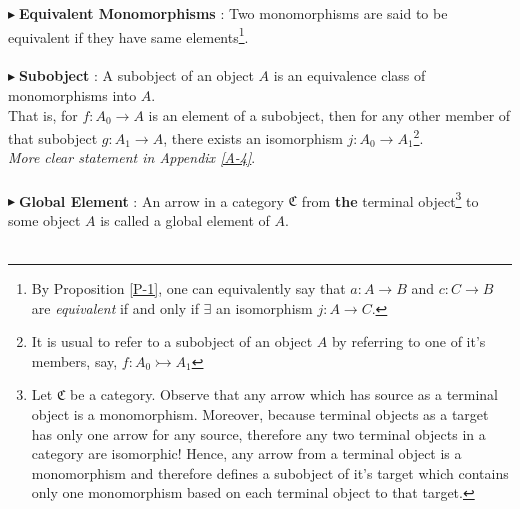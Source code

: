 \documentclass{article}
\theoremstyle{definition}
\theoremstyle{remark}
\theoremstyle{definition}
\theoremstyle{definition}
\theoremstyle{definition}
\newcommand{\cat}[1]{\mathfrak{#1}}
\newcommand{\point}[0]{$\blacktriangleright\;$}
\begin{document}
\point \textbf{Equivalent Monomorphisms} : Two monomorphisms are said to be equivalent if they have same elements\footnote{By Proposition \ref{P-1}, one can equivalently say that $ a : A\to B $ and $ c : C\to B $ are \emph{equivalent} if and only if $ \exists $ an isomorphism $ j : A \to C $.}.\\\\
\point \textbf{Subobject} : A subobject of an object $ A $ is an equivalence class of monomorphisms into $ A $.\\
 That is, for $ f : A_0 \to A $ is an element of a subobject, then for any other member of that subobject $ g : A_1\to A $, there exists an isomorphism $ j : A_0 \to A_1 $\footnote{It is usual to refer to a subobject of an object $ A $ by referring to one of it's members, say, $ f : A_0 \rightarrowtail A_1 $}. \\
 \emph{More clear statement in Appendix \ref{A-4}}.\\\\
\point \textbf{Global Element} : An arrow in a category $ \cat{C} $ from \textbf{the} terminal object\footnote{Let $ \cat{C} $ be a category. Observe that any arrow which has source as a terminal object is a monomorphism. Moreover, because terminal objects as a target has only one arrow for any source, therefore any two terminal objects in a category are isomorphic! Hence, any arrow from a terminal object is a monomorphism and therefore defines a subobject of it's target which contains only one monomorphism based on each terminal object to that target.} to some object $ A $ is called a global element of $ A $.\\\\

\newpage
\end{document}
